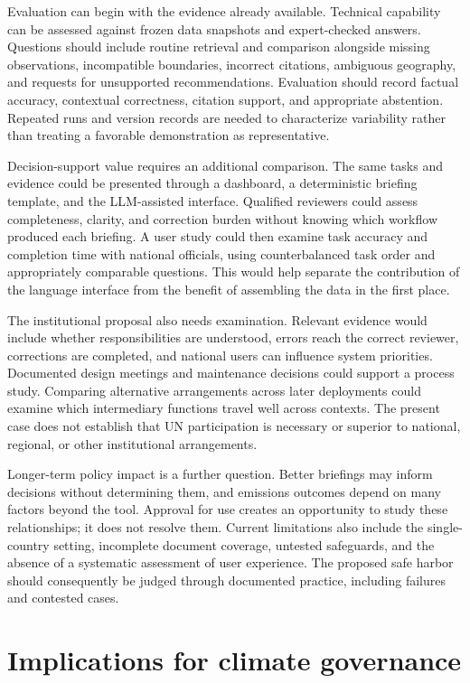 \documentclass[11pt]{article}
\begin{document}
Evaluation can begin with the evidence already available. Technical capability can be assessed against frozen data snapshots and expert-checked answers. Questions should include routine retrieval and comparison alongside missing observations, incompatible boundaries, incorrect citations, ambiguous geography, and requests for unsupported recommendations. Evaluation should record factual accuracy, contextual correctness, citation support, and appropriate abstention. Repeated runs and version records are needed to characterize variability rather than treating a favorable demonstration as representative.

Decision-support value requires an additional comparison. The same tasks and evidence could be presented through a dashboard, a deterministic briefing template, and the LLM-assisted interface. Qualified reviewers could assess completeness, clarity, and correction burden without knowing which workflow produced each briefing. A user study could then examine task accuracy and completion time with national officials, using counterbalanced task order and appropriately comparable questions. This would help separate the contribution of the language interface from the benefit of assembling the data in the first place.

The institutional proposal also needs examination. Relevant evidence would include whether responsibilities are understood, errors reach the correct reviewer, corrections are completed, and national users can influence system priorities. Documented design meetings and maintenance decisions could support a process study. Comparing alternative arrangements across later deployments could examine which intermediary functions travel well across contexts. The present case does not establish that UN participation is necessary or superior to national, regional, or other institutional arrangements.

Longer-term policy impact is a further question. Better briefings may inform decisions without determining them, and emissions outcomes depend on many factors beyond the tool. Approval for use creates an opportunity to study these relationships; it does not resolve them. Current limitations also include the single-country setting, incomplete document coverage, untested safeguards, and the absence of a systematic assessment of user experience. The proposed safe harbor should consequently be judged through documented practice, including failures and contested cases.

\section*{Implications for climate governance}
\end{document}

